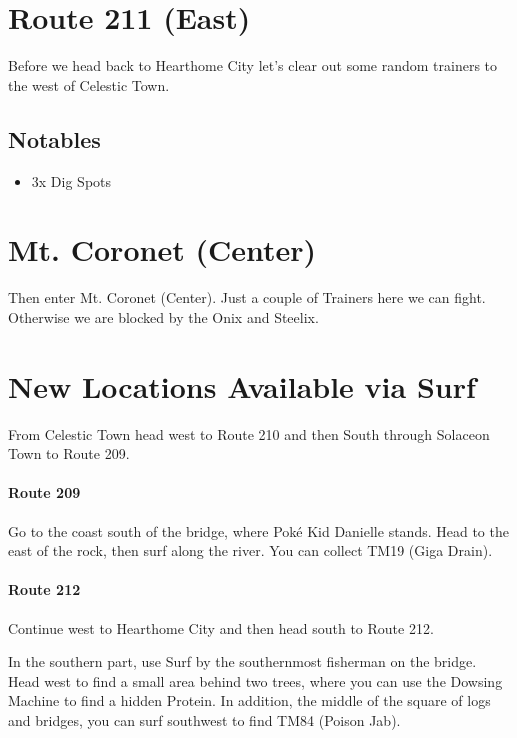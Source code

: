 \documentclass[11pt]{article}
\begin{document}
\section{Route 211 (East)}\label{sec:Route_211_(East)}
Before we head back to Hearthome City let's clear out some random trainers to
the west of Celestic Town.

\subsection{Notables}\label{subsec:notables-route-211-east}

\begin{itemize}
    \item 3x Dig Spots
\end{itemize}

\section{Mt. Coronet (Center)}

Then enter Mt. Coronet (Center).
Just a couple of Trainers here we can fight.
Otherwise we are blocked by the Onix and Steelix.



\section{New Locations Available via Surf}\label{sec:new-locations-available-via-surf}

From Celestic Town head west to Route 210 and then South through
Solaceon Town to Route 209.

\paragraph{Route 209}
Go to the coast south of the bridge, where Poké Kid Danielle stands.
Head to the east of the rock, then surf along the river.
You can collect TM19 (Giga Drain).

\paragraph{Route 212}
Continue west to Hearthome City and then head south to Route 212.

In the southern part, use Surf by the southernmost fisherman on the bridge.
Head west to find a small area behind two trees,
where you can use the Dowsing Machine to find a hidden Protein.
In addition, the middle of the square of logs and bridges, you can surf southwest to find TM84 (Poison Jab).
\end{document}
